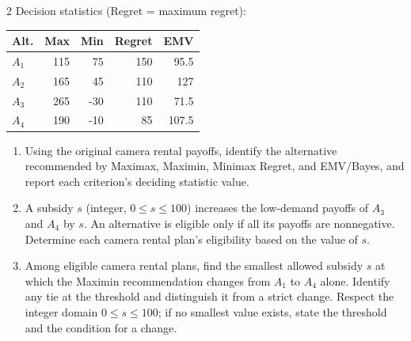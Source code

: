 \begin{multicols}{2}
\columnbreak
Decision statistics (Regret = maximum regret):

\vspace{-3mm}
\begin{center}\small\setlength{\tabcolsep}{4pt}
	\begin{tabular}{lrrrr}\toprule
		Alt. & Max & Min & Regret & EMV\\ \midrule
				$A_1$ & 115 & 75 & 150 & 95.5\\
		$A_2$ & 165 & 45 & 110 & 127\\
		$A_3$ & 265 & -30 & 110 & 71.5\\
		$A_4$ & 190 & -10 & 85 & 107.5\\
		\bottomrule
	\end{tabular}
\end{center}
\vspace{-3mm}

\begin{enumerate}[label=\textbf{(\alph*)},leftmargin=*]
	\item Using the original camera rental payoffs, identify the alternative recommended by Maximax, Maximin, Minimax Regret, and EMV/Bayes, and report each criterion's deciding statistic value. 

	\item A subsidy $s$ (integer, $0\leq s\leq100$) increases the low-demand payoffs of $A_3$ and $A_4$ by $s$. An alternative is eligible only if all its payoffs are nonnegative. Determine each camera rental plan's eligibility based on the value of $s$. 

	\item Among eligible camera rental plans, find the smallest allowed subsidy $s$ at which the Maximin recommendation changes from $A_1$ to $A_4$ alone. Identify any tie at the threshold and distinguish it from a strict change. Respect the integer domain $0\leq s\leq100$; if no smallest value exists, state the threshold and the condition for a change. 
\end{enumerate}


\end{multicols}
\newpage
